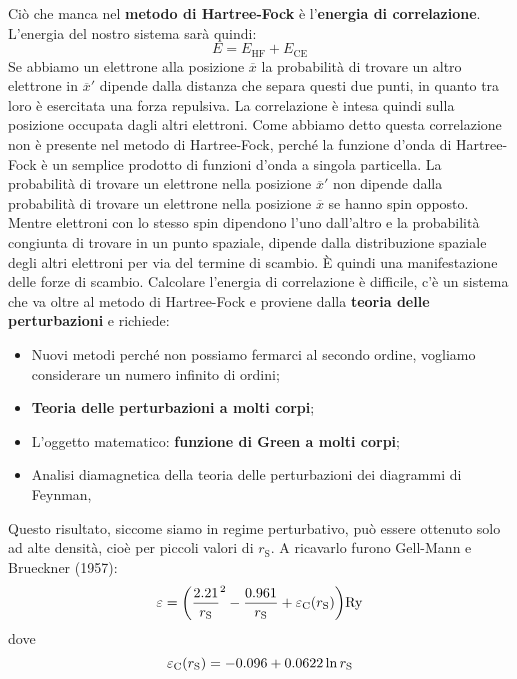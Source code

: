 Ciò che manca nel \textbf{metodo di Hartree-Fock} è l'\textbf{energia di correlazione}. L'energia del nostro sistema sarà quindi:
\begin{equation*}
    E=E_{\text{HF}}+E_{\text{CE}}
\end{equation*}
Se abbiamo un elettrone alla posizione $\overline x$ la probabilità di trovare un altro elettrone in $\overline{x}'$ dipende dalla distanza che separa questi due punti, in quanto tra loro è esercitata una forza repulsiva. La correlazione è intesa quindi sulla posizione occupata dagli altri elettroni. Come abbiamo detto questa correlazione non è presente nel metodo di Hartree-Fock, perché la funzione d'onda di Hartree-Fock è un semplice prodotto di funzioni d'onda a singola particella. La probabilità di trovare un elettrone nella posizione $\overline{x}'$ non dipende dalla probabilità di trovare un elettrone nella posizione $\overline x$ se hanno spin opposto. Mentre elettroni con lo stesso spin dipendono l'uno dall'altro e la probabilità congiunta di trovare in un punto spaziale, dipende dalla distribuzione spaziale degli altri elettroni per via del termine di scambio. È quindi una manifestazione delle forze di scambio.
Calcolare l'energia di correlazione è difficile, c'è un sistema che va oltre al metodo di Hartree-Fock e proviene dalla \textbf{teoria delle perturbazioni} e richiede:
\begin{itemize}
    \item Nuovi metodi perché non possiamo fermarci al secondo ordine, vogliamo considerare un numero infinito di ordini;
    \item \textbf{Teoria delle perturbazioni a molti corpi};
    \item L'oggetto matematico: \textbf{funzione di Green a molti corpi}; 
    \item Analisi diamagnetica della teoria delle perturbazioni dei diagrammi di Feynman,
\end{itemize}
Questo risultato, siccome siamo in regime perturbativo, può essere ottenuto solo ad alte densità, cioè per piccoli valori di $r_\text{S}$. A ricavarlo furono Gell-Mann e Brueckner (1957):
\begin{equation*}
    \varepsilon=\bigg(\frac{2.21}{r_\text{S}}^2-\frac{0.961}{r_\text{S}}+\varepsilon_{\text C}(r_\text{S})\bigg)\text{Ry}
\end{equation*}
dove
\begin{equation*}
    \varepsilon_{\text C}(r_\text{S})=-0.096+0.0622\ln{r_\text{S}}
\end{equation*}
